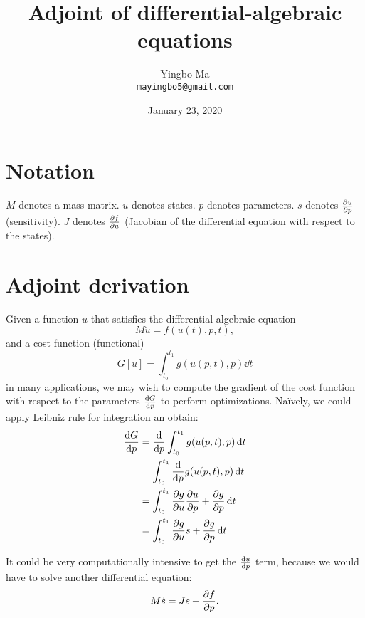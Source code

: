 \documentclass[a4paper,9pt,twocolumn]{article}
\theoremstyle{definition}
\theoremstyle{remark}
\begin{document}
\author{Yingbo Ma\\
        \tt{mayingbo5@gmail.com}}
\title{Adjoint of differential-algebraic equations}
\date{January 23, 2020}

\maketitle

\section{Notation}
$M$ denotes a mass matrix. $u$ denotes states. $p$ denotes parameters. $s$
denotes $\pdv{u}{p}$ (sensitivity). $J$ denotes $\pdv{f}{u}$ (Jacobian of the
differential equation with respect to the states).

\section{Adjoint derivation}
Given a function $u$ that satisfies the differential-algebraic equation
\begin{equation} \label{eq:de}
  M\dot{u} = f(u(t), p, t),
\end{equation}
and a cost function (functional)
\begin{equation}
  G[u] = \int_{t_0}^{t_1} g(u(p, t), p) \dd{t}
\end{equation}
in many applications, we may wish to compute the gradient of the cost function
with respect to the parameters $\dv{G}{p}$ to perform optimizations. Na\"ively,
we could apply Leibniz rule for integration an obtain:
\begin{align}
  \dv{G}{p} &= \dv{p} \int_{t_0}^{t_1} g(u(p, t), p) \dd{t} \\
            &= \int_{t_0}^{t_1} \dv{p} g(u(p, t), p) \dd{t} \\
            &= \int_{t_0}^{t_1} \pdv{g}{u}\pdv{u}{p} + \pdv{g}{p} \dd{t} \\
            &= \int_{t_0}^{t_1} \pdv{g}{u}s + \pdv{g}{p} \dd{t}
            \label{eq:dgdp}
\end{align}

It could be very computationally intensive to get the $\dv{u}{p}$ term, because
we would have to solve another differential equation:
\begin{equation} \label{eq:forward_sens}
  M\dot{s} = Js + \pdv{f}{p}.
\end{equation}
\end{document}
